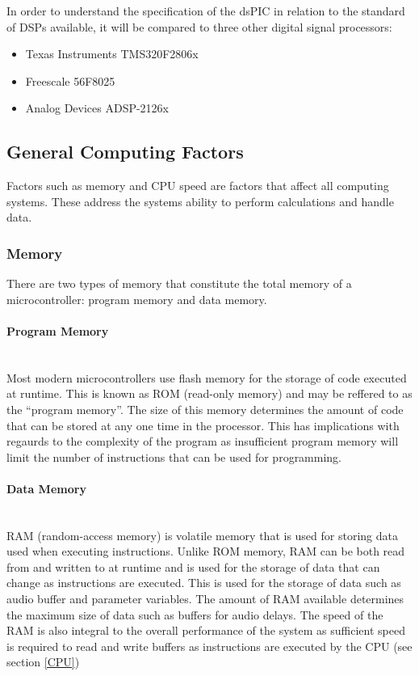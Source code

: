 \documentclass[titlepage]{scrartcl}
\begin{document}
    In order to understand the specification of the dsPIC in relation to the
    standard of DSPs available, it will be compared to three other digital signal
    processors:
    \begin{itemize}
        \item Texas Instruments TMS320F2806x
        \item Freescale 56F8025
        \item Analog Devices ADSP-2126x
    \end{itemize}

    \subsection{General Computing Factors}
    Factors such as memory and CPU speed are factors that affect all computing
    systems. These address the systems ability to perform calculations and
    handle data.

    \subsubsection{Memory}
    There are two types of memory that constitute the total memory of a
    microcontroller: program memory and data memory.

    \paragraph{Program Memory}~\\
    Most modern microcontrollers use flash memory for the storage of code
    executed at runtime. This is known as ROM (read-only memory) and may be
    reffered to as the ``program memory''. The size of this memory determines
    the amount of code that can be stored at any one time in the processor.
    This has implications with regaurds to the complexity of the program as
    insufficient program memory will limit the number of instructions that can
    be used for programming.

    \paragraph{Data Memory}~\\
    RAM (random-access memory) is volatile memory that is used for storing data
    used when executing instructions. Unlike ROM memory, RAM can be both read
    from and written to at runtime and is used for the storage of data that can
    change as instructions are executed. This is used for the storage of data
    such as audio buffer and parameter variables. The amount of RAM available
    determines the maximum size of data such as buffers for audio delays. The
    speed of the RAM is also integral to the overall performance of the system
    as sufficient speed is required to read and write buffers as instructions
    are executed by the CPU (see section \ref{CPU})
\end{document}
